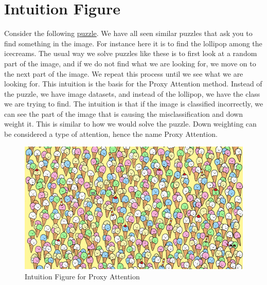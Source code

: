 \documentclass[a4paper,11pt,openright]{book}
\begin{document}
\section{Intuition Figure} \label{sec:intuition_figure}
Consider the following \href{https://www.thesun.co.uk/fabulous/15681738/brainteaser-lollipop-ice-cream/}{puzzle}. We have all seen similar puzzles that ask you to find something in the image. For instance here it is to find the lollipop
among the icecreams. 
The usual way we solve puzzles like these is to first look at a random part of the image, and if we do not find what we are looking for, we move on to the next part of the image. We repeat this process until we see what we are looking for. This intuition is the basis for the Proxy Attention method. Instead of the puzzle, we have image datasets, and instead of the lollipop, we have the class we are trying to find. The intuition is that if the image is classified incorrectly, we can see the part of the image that is causing the misclassification and down weight it. This is similar to how we would solve the puzzle. Down weighting can be considered a type of attention, hence the name Proxy Attention.
\begin{figure}[!htb]
    \centering
    \includegraphics[width=0.6\linewidth]{images/clutter.png}
    \caption{Intuition Figure for Proxy Attention}
    \label{fig:inti}
\end{figure}
\end{document}

